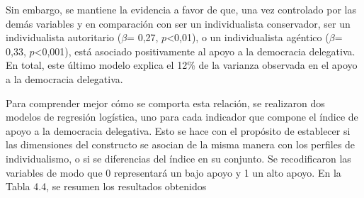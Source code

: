 \documentclass[12pt,twoside]{templates/facsothesis}
\begin{document}
Sin embargo, se mantiene la evidencia a favor de que, una vez controlado por las demás variables y en comparación con ser un individualista conservador, ser un individualista autoritario (\(\beta\)= 0,27, \(p\)\textless0,01), o un individualista agéntico (\(\beta\)= 0,33, \(p\)\textless0,001), está asociado positivamente al apoyo a la democracia delegativa. En total, este último modelo explica el 12\% de la varianza observada en el apoyo a la democracia delegativa.

Para comprender mejor cómo se comporta esta relación, se realizaron dos modelos de regresión logística, uno para cada indicador que compone el índice de apoyo a la democracia delegativa. Esto se hace con el propósito de establecer si las dimensiones del constructo se asocian de la misma manera con los perfiles de individualismo, o si se diferencias del índice en su conjunto. Se recodificaron las variables de modo que 0 representará un bajo apoyo y 1 un alto apoyo. En la Tabla 4.4, se resumen los resultados obtenidos
\end{document}
